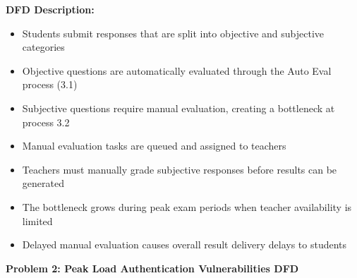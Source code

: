 \documentclass[12pt,a4paper,oneside]{book}
\begin{document}
\textbf{DFD Description:} 
\begin{itemize}
    \item Students submit responses that are split into objective and subjective categories
    \item Objective questions are automatically evaluated through the Auto Eval process (3.1)
    \item Subjective questions require manual evaluation, creating a bottleneck at process 3.2
    \item Manual evaluation tasks are queued and assigned to teachers
    \item Teachers must manually grade subjective responses before results can be generated
    \item The bottleneck grows during peak exam periods when teacher availability is limited
    \item Delayed manual evaluation causes overall result delivery delays to students
\end{itemize}

\vspace{0.5cm}

\textbf{Problem 2: Peak Load Authentication Vulnerabilities DFD}
\end{document}
